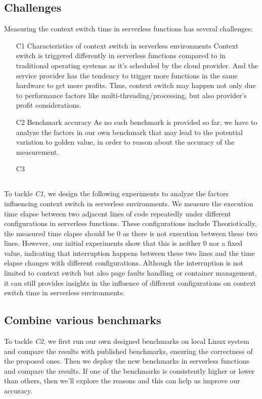 


\subsection{Challenges}
Measuring the context switch time in serverless functions has several challenges:
\begin{itemize}
	\item [C1] Characteristics of context switch in serverless environments
	Context switch is triggered differently in serverless functions compared to in traditional operating systems as it's scheduled by the cloud provider.
	And the service provider has the tendency to trigger more functions in the same hardware to get more profits. 
	Thus, context switch may happen not only due to performance factors like multi-threading/processing, but also provider's profit considerations.
	\item [C2] Benchmark accuracy
	As no such benchmark is provided so far, we have to analyze the factors in our own benchmark that may lead to the potential variation to golden value, 
	in order to reason about the accuracy of the measurement.
	\item [C3] 
\end{itemize}

\subsection{}
	To tackle \emph{C1}, we design the following experiments to analyze the factors influencing context switch in serverless environments.
	We measure the execution time elapse between two adjacent lines of code repeatedly under different configurations in serverless functions.
	These configurations include %
	Theoriotically, the measured time elapse should be 0 as there is not execution between these two lines. 
	However, our initial experiments show that this is neither 0 nor a fixed value, indicating that interruption happens between these two lines
	and the time elapse changes with different configurations. 
	Although the interruption is not limited to context switch but also page faults handling or container management, 
	it can still provides insights in the influence of different configurations on context switch time in serverless environments.


\subsection{Combine various benchmarks}
	To tackle \emph{C2}, we first run our own designed benchmarks on local Linux system and compare the results with published benchmarks\cite{cs-lmbench,cs-pipes,cs-arm,cs-web},
	 ensuring the correctness of the proposed ones. Then we deploy the new benchmarks in serverless functions and compare the results. 
	 If one of the benchmarks is consistently higher or lower than others, then we'll explore the reasons and this can help us improve our accuracy.

